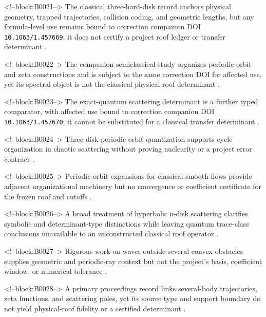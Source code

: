 \documentclass[11pt,a4paper]{article}
\begin{document}
<!--block:B0021-->
The classical three-hard-disk record anchors physical geometry, trapped trajectories, collision coding, and geometric lengths, but any formula-level use remains bound to correction companion DOI \texttt{10.1063/1.457669}; it does not certify a project roof ledger or transfer determinant
\citep{P30-S01}.

<!--block:B0022-->
The companion semiclassical study organizes periodic-orbit and zeta constructions and is subject to the same correction DOI for affected use, yet its spectral object is not the classical physical-roof determinant
\citep{P30-S02}.

<!--block:B0023-->
The exact-quantum scattering determinant is a further typed comparator, with affected use bound to correction companion DOI \texttt{10.1063/1.457670}; it cannot be substituted for a classical transfer determinant
\citep{P30-S03}.

<!--block:B0024-->
Three-disk periodic-orbit quantization supports cycle organization in chaotic scattering without proving nuclearity or a project error contract
\citep{P30-S04}.

<!--block:B0025-->
Periodic-orbit expansions for classical smooth flows provide adjacent organizational machinery but no convergence or coefficient certificate for the frozen roof and cutoffs
\citep{P30-S05}.

<!--block:B0026-->
A broad treatment of hyperbolic \texttt{n}-disk scattering clarifies symbolic and determinant-type distinctions while leaving quantum trace-class conclusions unavailable to an unconstructed classical roof operator
\citep{P30-S06}.

<!--block:B0027-->
Rigorous work on waves outside several convex obstacles supplies geometric and periodic-ray context but not the project's basis, coefficient window, or numerical tolerance
\citep{P30-S09}.

<!--block:B0028-->
A primary proceedings record links several-body trajectories, zeta functions, and scattering poles, yet its source type and support boundary do not yield physical-roof fidelity or a certified determinant
\citep{P30-S10}.
\end{document}

